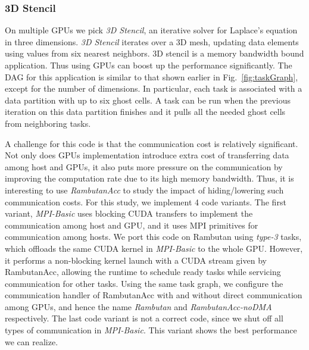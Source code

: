 \subsubsection{3D Stencil}
On multiple GPUs we pick {\em 3D Stencil}, an iterative solver for Laplace's equation in three dimensions.
{\em 3D Stencil} iterates over a 3D mesh, updating data elements using values from six nearest neighbors.
3D stencil is a memory bandwidth bound application. 
Thus using GPUs can boost up the performance significantly.
The DAG for this application is similar to that shown earlier in Fig.~\ref{fig:taskGraph}, except for the number of dimensions.
In particular, each task is associated with a data partition with up to six ghost cells.
A task can be run when the previous iteration on this data partition finishes and it pulls all the needed ghost cells from neighboring tasks.

A challenge for this code is that the communication cost is relatively significant.
Not only does GPUs implementation introduce extra cost of transferring data among host and GPUs, it also puts more pressure on the communication by improving the computation rate due to its high memory bandwidth.
Thus, it is interesting to use {\em RambutanAcc} to study the impact of hiding/lowering such communication costs.
For this study, we implement 4 code variants.
The first variant, {\em MPI-Basic} uses blocking CUDA transfers to implement the communication among host and GPU, and it uses MPI primitives for communication among hosts. 
We port this code on Rambutan using {\em type-3} tasks, which offloads the same CUDA kernel in {\em MPI-Basic} to the whole GPU.
However, it performs a non-blocking kernel launch with a CUDA stream given by RambutanAcc, allowing the runtime to schedule ready tasks while servicing communication for other tasks.
Using the same task graph, we configure the communication handler of RambutanAcc with and without direct communication among GPUs, and hence the name {\em Rambutan} and {\em RambutanAcc-noDMA} respectively.
The last code variant is not a correct code, since we shut off all types of communication in {\em MPI-Basic}. 
This variant shows the best performance we can realize.

